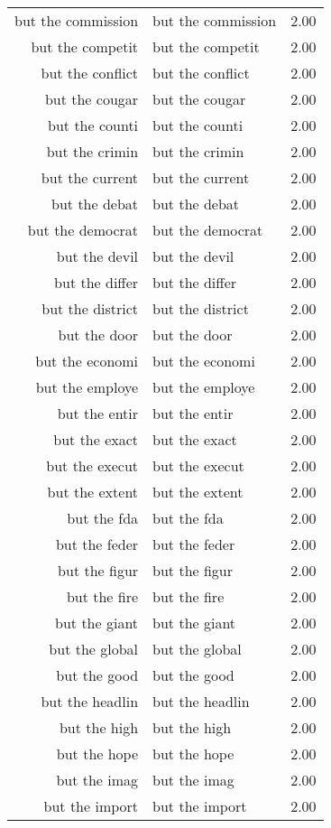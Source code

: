 \begin{table}[ht]
\begin{tabular}{rlr}
  but the commission & but the commission & 2.00 \\ 
  but the competit & but the competit & 2.00 \\ 
  but the conflict & but the conflict & 2.00 \\ 
  but the cougar & but the cougar & 2.00 \\ 
  but the counti & but the counti & 2.00 \\ 
  but the crimin & but the crimin & 2.00 \\ 
  but the current & but the current & 2.00 \\ 
  but the debat & but the debat & 2.00 \\ 
  but the democrat & but the democrat & 2.00 \\ 
  but the devil & but the devil & 2.00 \\ 
  but the differ & but the differ & 2.00 \\ 
  but the district & but the district & 2.00 \\ 
  but the door & but the door & 2.00 \\ 
  but the economi & but the economi & 2.00 \\ 
  but the employe & but the employe & 2.00 \\ 
  but the entir & but the entir & 2.00 \\ 
  but the exact & but the exact & 2.00 \\ 
  but the execut & but the execut & 2.00 \\ 
  but the extent & but the extent & 2.00 \\ 
  but the fda & but the fda & 2.00 \\ 
  but the feder & but the feder & 2.00 \\ 
  but the figur & but the figur & 2.00 \\ 
  but the fire & but the fire & 2.00 \\ 
  but the giant & but the giant & 2.00 \\ 
  but the global & but the global & 2.00 \\ 
  but the good & but the good & 2.00 \\ 
  but the headlin & but the headlin & 2.00 \\ 
  but the high & but the high & 2.00 \\ 
  but the hope & but the hope & 2.00 \\ 
  but the imag & but the imag & 2.00 \\ 
  but the import & but the import & 2.00 \\ 

\end{tabular}
\end{table}
